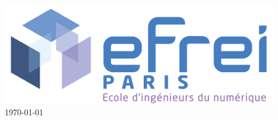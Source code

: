 \begin{titlepage}

\includegraphics[width=0.9\textwidth]{logo-efrei-paris-cover.jpg}\\[2.5cm] %


{\large \today}\\[3cm] %

\vfill %

\end{titlepage}